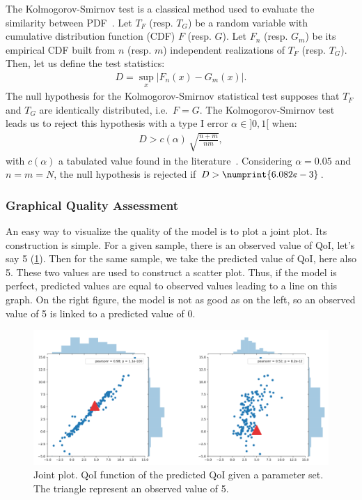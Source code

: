 The Kolmogorov-Smirnov test is a classical method used to evaluate the similarity between PDF~\citep{clarke1992}. Let $T_F$ (resp. $T_G$) be a random variable with cumulative distribution function (CDF) $F$ (resp. $G$). Let $F_n$ (resp. $G_m$) be its empirical CDF built from $n$ (resp. $m$) independent realizations of $T_F$ (resp. $T_G$). Then, let us define the test statistics:
\begin{align}
D = \sup_{x} \lvert F_n(x) - G_m(x)\rvert.
\end{align}
The null hypothesis for the Kolmogorov-Smirnov statistical test supposes that $T_F$ and $T_G$ are identically distributed, i.e.~$F=G$. The Kolmogorov-Smirnov test leads us to reject this hypothesis with a type I error $\alpha\in]0,1[$ when:
\begin{align}
D > c(\alpha)\,\sqrt{\frac{n+m}{nm}}, \label{eq:nullhypothesis}
\end{align}
with $c(\alpha)$ a tabulated value found in the literature~\citep{smirnov1939}. Considering $\alpha = 0.05$ and $n = m = N$, the null hypothesis is rejected if $D > \numprint{6.082e-3}$.

\subsubsection{Graphical Quality Assessment}
An easy way to visualize the quality of the model is to plot a joint plot. Its construction is simple. For a given sample, there is an observed value of QoI, let's say 5 (\cref{fig:qq_plot}). Then for the same sample, we take the predicted value of QoI, here also 5. These two values are used to construct a scatter plot. Thus, if the model is perfect, predicted values are equal to observed values leading to a line on this graph. On the right figure, the model is not as good as on the left, so an observed value of 5 is linked to a predicted value of 0.

\begin{figure}[H]
\centering
\includegraphics[width=0.6\linewidth,keepaspectratio]{fig/literature/qq_plot.png}
\caption{Joint plot. QoI function of the predicted QoI given a parameter set. The triangle represent an observed value of 5.}
\label{fig:qq_plot}
\end{figure}

